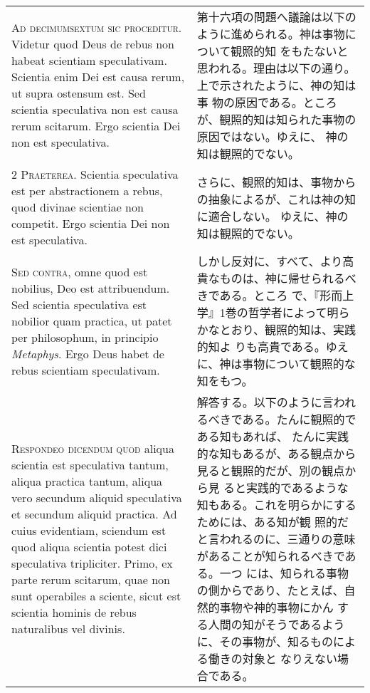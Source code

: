 \documentclass[10pt]{jsarticle} %
\begin{document}
\begin{longtable}{p{21em}p{21em}}


{\huge A}{\scshape d decimumsextum sic proceditur}. Videtur
quod Deus de rebus non habeat scientiam speculativam. Scientia enim Dei
est causa rerum, ut supra ostensum est. Sed scientia speculativa non est
causa rerum scitarum. Ergo scientia Dei non est speculativa.

&

第十六項の問題へ議論は以下のように進められる。神は事物について観照的知
をもたないと思われる。理由は以下の通り。上で示されたように、神の知は事
物の原因である。ところが、観照的知は知られた事物の原因ではない。ゆえに、
神の知は観照的でない。


\\


{\scshape 2 Praeterea}. Scientia speculativa est per
abstractionem a rebus, quod divinae scientiae non competit. Ergo
scientia Dei non est speculativa.

&

さらに、観照的知は、事物からの抽象によるが、これは神の知に適合しない。
ゆえに、神の知は観照的でない。

\\


{\scshape Sed contra}, omne quod est nobilius, Deo est attribuendum. Sed
scientia speculativa est nobilior quam practica, ut patet per
philosophum, in principio {\itshape Metaphys}. Ergo Deus habet de rebus
scientiam speculativam.

&

しかし反対に、すべて、より高貴なものは、神に帰せられるべきである。ところ
で、『形而上学』1巻の哲学者によって明らかなとおり、観照的知は、実践的知よ
りも高貴である。ゆえに、神は事物について観照的な知をもつ。


\\


{\scshape Respondeo dicendum quod} aliqua scientia est
speculativa tantum, aliqua practica tantum, aliqua vero secundum aliquid
speculativa et secundum aliquid practica. Ad cuius evidentiam, sciendum
est quod aliqua scientia potest dici speculativa tripliciter. Primo, ex
parte rerum scitarum, quae non sunt operabiles a sciente, sicut est
scientia hominis de rebus naturalibus vel divinis. 


&

解答する。以下のように言われるべきである。たんに観照的である知もあれば、
たんに実践的な知もあるが、ある観点から見ると観照的だが、別の観点から見
ると実践的であるような知もある。これを明らかにするためには、ある知が観
照的だと言われるのに、三通りの意味があることが知られるべきである。一つ
には、知られる事物の側からであり、たとえば、自然的事物や神的事物にかん
する人間の知がそうであるように、その事物が、知るものによる働きの対象と
なりえない場合である。


\end{longtable}
\end{document}
